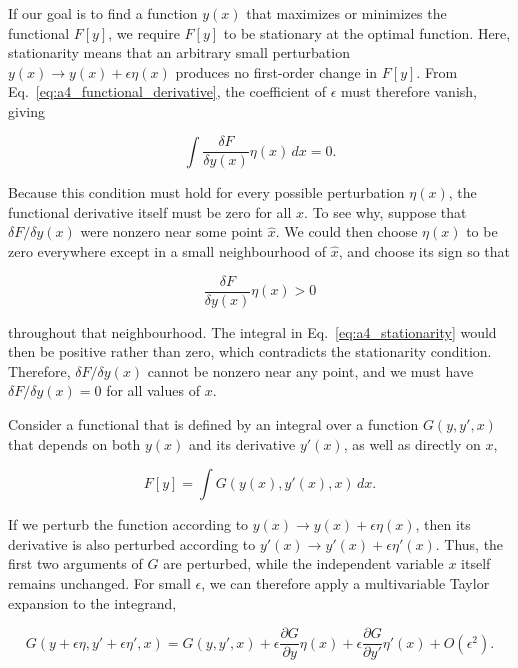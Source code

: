 \documentclass[10pt,twocolumn]{memoir}
\begin{document}
If our goal is to find a function $y(x)$ that maximizes or minimizes the functional $F[y]$, we require $F[y]$ to be stationary at the optimal function. Here, stationarity means that an arbitrary small perturbation $y(x)\rightarrow y(x)+\epsilon\eta(x)$ produces no first-order change in $F[y]$. From Eq.~\ref{eq:a4_functional_derivative}, the coefficient of $\epsilon$ must therefore vanish, giving

\begin{equation}
    \int\frac{\delta F}{\delta y(x)}\eta(x)\,dx = 0.
\label{eq:a4_stationarity}
\end{equation}

Because this condition must hold for every possible perturbation $\eta(x)$, the functional derivative itself must be zero for all $x$. To see why, suppose that $\delta F/\delta y(x)$ were nonzero near some point $\hat{x}$. We could then choose $\eta(x)$ to be zero everywhere except in a small neighbourhood of $\hat{x}$, and choose its sign so that

\begin{equation}
    \frac{\delta F}{\delta y(x)}\eta(x) > 0
\end{equation}

throughout that neighbourhood. The integral in Eq.~\ref{eq:a4_stationarity} would then be positive rather than zero, which contradicts the stationarity condition. Therefore, $\delta F/\delta y(x)$ cannot be nonzero near any point, and we must have $\delta F/\delta y(x)=0$ for all values of $x$.

Consider a functional that is defined by an integral over a function $G(y,y',x)$ that depends on both $y(x)$ and its derivative $y'(x)$, as well as directly on $x$,

\begin{equation}
    F[y] = \int G\left(y(x),y'(x),x\right)\,dx.
\end{equation}

If we perturb the function according to $y(x)\rightarrow y(x)+\epsilon\eta(x)$, then its derivative is also perturbed according to $y'(x)\rightarrow y'(x)+\epsilon\eta'(x)$. Thus, the first two arguments of $G$ are perturbed, while the independent variable $x$ itself remains unchanged. For small $\epsilon$, we can therefore apply a multivariable Taylor expansion to the integrand,

\begin{equation}
    G(y+\epsilon\eta,y'+\epsilon\eta',x) = G(y,y',x) + \epsilon\frac{\partial G}{\partial y}\eta(x) + \epsilon\frac{\partial G}{\partial y'}\eta'(x) + O(\epsilon^2).
\end{equation}
\end{document}
